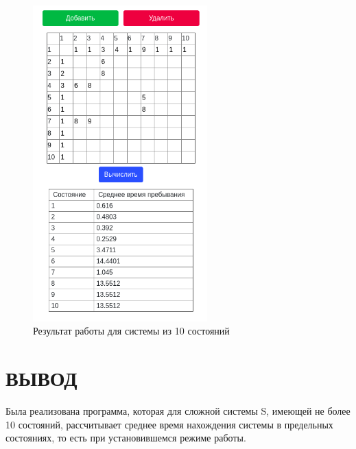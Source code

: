 \begin{figure}[H]
    \centering
    \includegraphics[width=0.6\textwidth]{images/scr03.png}
    \caption{Результат работы для системы из 10 состояний}
    \label{fig:3}
\end{figure}

\chapter*{\hfill{}ВЫВОД\hfill{}}

Была реализована программа, которая для сложной системы S, имеющей не более 10 состояний, рассчитывает среднее время нахождения системы в предельных состояниях, то есть при установившемся режиме работы.
